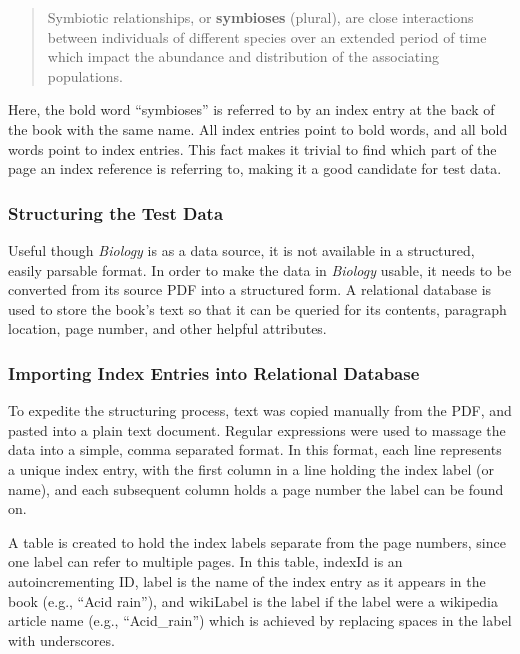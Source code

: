 \begin{quote}
Symbiotic relationships, or {\bf symbioses} (plural), are close interactions between individuals of different species over an extended period of time which impact the abundance and distribution of the associating populations. \cite{biology}
\end{quote}

\noindent Here, the bold word ``symbioses'' is referred to by an index entry at the back of the book with the same name. All index entries point to bold words, and all bold words point to index entries. This fact makes it trivial to find which part of the page an index reference is referring to, making it a good candidate for test data.

\subsubsection{Structuring the Test Data}

Useful though {\it Biology} is as a data source, it is not available in a structured, easily parsable format.
In order to make the data in {\it Biology} usable, it needs to be converted from its source PDF into a structured form.
A relational database is used to store the book's text so that it can be queried for its contents, paragraph location, page number, and other helpful attributes.

\subsubsection{Importing Index Entries into Relational Database}

To expedite the structuring process, text was copied manually from the PDF, and pasted into a plain text document.
Regular expressions were used to massage the data into a simple, comma separated format.
In this format, each line represents a unique index entry, with the first column in a line holding the index label (or name), and each subsequent column holds a page number the label can be found on.

A table is created to hold the index labels separate from the page numbers, since one label can refer to multiple pages.
In this table, indexId is an autoincrementing ID, label is the name of the index entry as it appears in the book (e.g., ``Acid rain''), and wikiLabel is the label if the label were a wikipedia article name (e.g., ``Acid\_rain'') which is achieved by replacing spaces in the label with underscores.

